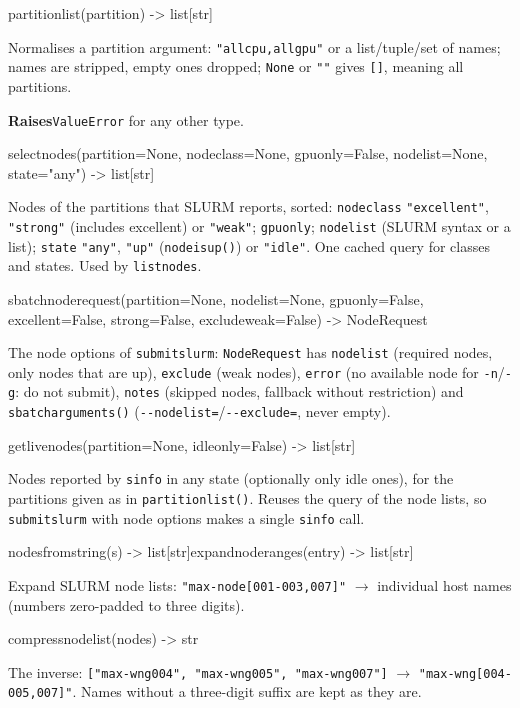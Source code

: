 \documentclass[11pt,a4paper]{article}
\newcommand{\api}[1]{%
  \par\medskip
  \begin{tcolorbox}[colback=sigbg, colframe=sigbg, boxrule=0pt, arc=1pt, left=4pt, right=4pt, top=2pt, bottom=2pt, breakable]
  \raggedright\ttfamily\small #1
  \end{tcolorbox}\nopagebreak\vspace{-4pt}%
}
\DeclareRobustCommand{\_}{\textunderscore\allowbreak}
\newcommand{\cmd}[1]{\texttt{#1}}
\newcommand{\raises}{\par\textsf{\small\bfseries Raises}\quad}
\begin{document}
\api{partition\_list(partition) -> list[str]}
Normalises a partition argument: \cmd{"allcpu,allgpu"} or a list/tuple/set of names; names are
stripped, empty ones dropped; \cmd{None} or \cmd{""} gives \cmd{[]}, meaning all partitions.
\raises \cmd{ValueError} for any other type.

\api{select\_nodes(partition=None, node\_class=None, gpu\_only=False, nodelist=None, state="any") -> list[str]}
Nodes of the partitions that SLURM reports, sorted: \cmd{node\_class} \cmd{"excellent"},
\cmd{"strong"} (includes excellent) or \cmd{"weak"}; \cmd{gpu\_only}; \cmd{nodelist} (SLURM syntax
or a list); \cmd{state} \cmd{"any"}, \cmd{"up"} (\cmd{node\_is\_up()}) or \cmd{"idle"}. One cached
query for classes and states. Used by \cmd{listnodes}.

\api{sbatch\_node\_request(partition=None, nodelist=None, gpu\_only=False, excellent=False, strong=False, exclude\_weak=False) -> NodeRequest}
The node options of \cmd{submitslurm}: \cmd{NodeRequest} has \cmd{nodelist} (required nodes, only
nodes that are up), \cmd{exclude} (weak nodes), \cmd{error} (no available node for \cmd{-n}/\cmd{-g}:
do not submit), \cmd{notes} (skipped nodes, fallback without restriction) and
\cmd{sbatch\_arguments()} (\cmd{-{}-nodelist=}/\cmd{-{}-exclude=}, never empty).

\api{get\_live\_nodes(partition=None, idle\_only=False) -> list[str]}
Nodes reported by \cmd{sinfo} in any state (optionally only idle ones), for the partitions given
as in \cmd{partition\_list()}. Reuses the query of the node lists, so \cmd{submitslurm} with node
options makes a single \cmd{sinfo} call.

\api{nodes\_from\_string(s) -> list[str]\quad expand\_node\_ranges(entry) -> list[str]}
Expand SLURM node lists: \cmd{"max-node[001-003,007]"} $\rightarrow$ individual host names (numbers zero-padded to three digits).

\api{compress\_node\_list(nodes) -> str}
The inverse: \cmd{["max-wng004", "max-wng005", "max-wng007"]} $\rightarrow$
\cmd{"max-wng[004-005,007]"}. Names without a three-digit suffix are kept as they are.
\end{document}
